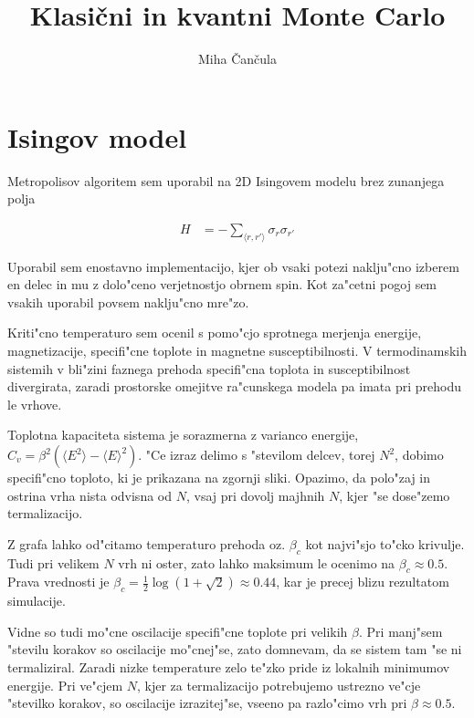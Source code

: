 \documentclass[a4paper,10pt]{article}
\title{Klasi\v cni in kvantni Monte Carlo}
\author{Miha \v Can\v cula}
\begin{document}
\maketitle

\section{Isingov model}

Metropolisov algoritem sem uporabil na 2D Isingovem modelu brez zunanjega polja

\begin{align}
 H &= -\sum_{\langle r, r' \rangle} \sigma_r \sigma_{r'} 
\end{align}


Uporabil sem enostavno implementacijo, kjer ob vsaki potezi naklju"cno izberem en delec in mu z dolo"ceno verjetnostjo obrnem spin. 
Kot za"cetni pogoj sem vsakih uporabil povsem naklju"cno mre"zo. 

Kriti"cno temperaturo sem ocenil s pomo"cjo sprotnega merjenja energije, magnetizacije, specifi"cne toplote in magnetne susceptibilnosti. 
V termodinamskih sistemih v bli"zini faznega prehoda specifi"cna toplota in susceptibilnost divergirata, zaradi prostorske omejitve ra"cunskega modela pa imata pri prehodu le vrhove. 

\begin{figure}[H]
 \centering
 
\end{figure}

Toplotna kapaciteta sistema je sorazmerna z varianco energije, $C_v = \beta^2 ( \langle E^2 \rangle - \langle E \rangle^2)$. 
"Ce izraz delimo s "stevilom delcev, torej $N^2$, dobimo specifi"cno toploto, ki je prikazana na zgornji sliki. 
Opazimo, da polo"zaj in ostrina vrha nista odvisna od $N$, vsaj pri dovolj majhnih $N$, kjer "se dose"zemo termalizacijo. 

Z grafa lahko od"citamo temperaturo prehoda oz. $\beta_c$ kot najvi"sjo to"cko krivulje. 
Tudi pri velikem $N$ vrh ni oster, zato lahko maksimum le ocenimo na $\beta_c \approx 0.5$. 
Prava vrednosti je $\beta_c = \frac{1}{2} \log(1 + \sqrt{2}) \approx 0.44$, kar je precej blizu rezultatom simulacije. 

Vidne so tudi mo"cne oscilacije specifi"cne toplote pri velikih $\beta$. 
Pri manj"sem "stevilu korakov so oscilacije mo"cnej"se, zato domnevam, da se sistem tam "se ni termaliziral. 
Zaradi nizke temperature zelo te"zko pride iz lokalnih minimumov energije. 
Pri ve"cjem $N$, kjer za termalizacijo potrebujemo ustrezno ve"cje "stevilko korakov, so oscilacije izrazitej"se, 
vseeno pa razlo"cimo vrh pri $\beta \approx 0.5$. 
\end{document}
